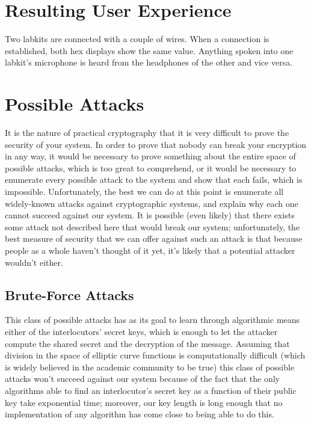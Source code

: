\documentclass[a4paper]{report}
\begin{document}
\section{Resulting User Experience}

Two labkits are connected with a couple of wires. When a connection is
established, both hex displays show the same value. Anything spoken into one
labkit's microphone is heard from the headphones of the other and vice versa.

\section{Possible Attacks}

It is the nature of practical cryptography that it is very difficult to prove the security of your system. In order to prove that nobody can break your encryption in any way, it would be necessary to prove something about the entire space of possible attacks, which is too great to comprehend, or it would be necessary to enumerate every possible attack to the system and show that each fails, which is impossible. Unfortunately, the best we can do at this point is enumerate all widely-known attacks against cryptographic systems, and explain why each one cannot succeed against our system. It is possible (even likely) that there exists some attack not described here that would break our system; unfortunately, the best measure of security that we can offer against such an attack is that because people as a whole haven't thought of it yet, it's likely that a potential attacker wouldn't either.

\subsection{Brute-Force Attacks} 

This class of possible attacks has as its goal to learn through algorithmic means either of the interlocutors' secret keys, which is enough to let the attacker compute the shared secret and the decryption of the message. Assuming that division in the space of elliptic curve functions is computationally difficult (which is widely believed in the academic community to be true) this class of possible attacks won't succeed against our system because of the fact that the only algorithms able to find an interlocutor's secret key as a function of their public key take exponential time; moreover, our key length is long enough that no implementation of any algorithm has come close to being able to do this.
\end{document}

